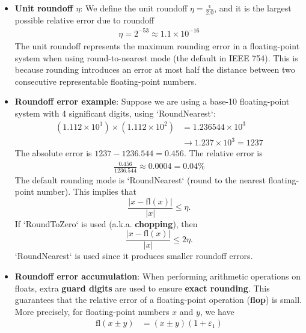 \documentclass{report}
\begin{document}
\begin{itemize}
            \item \textbf{Unit roundoff $\eta$}: We define the unit roundoff $\eta = \frac{\epsilon}{2.0}$, and it is the largest possible relative error due to roundoff
                \begin{align*}
                    \eta = 2^{-53} \approx 1.1 \times 10^{-16}
                \end{align*}
                \bigbreak \noindent 
                The unit roundoff represents the maximum rounding error in a floating-point system when using round-to-nearest mode
                \bigbreak \noindent 
                (the default in IEEE 754). This is because rounding introduces an error at most half the distance between two consecutive representable floating-point numbers.
            \item \textbf{Roundoff error example}: Suppose we are using a base-10 floating-point system with 4 significant digits, using `RoundNearest`:
                \begin{align*}
                    \left( 1.112 \times 10^1 \right) \times \left( 1.112 \times 10^2 \right)
                    & = 1.236544 \times 10^3 \\
                    & \rightarrow 1.237 \times 10^3 = 1237
                \end{align*}
                The absolute error is $1237 - 1236.544 = 0.456$.
                \bigbreak \noindent 
                The relative error is 
                \begin{align*}
                    \frac{0.456}{1236.544} \approx 0.0004 = 0.04 \%
                \end{align*}
                The default rounding mode is `RoundNearest` (round to the nearest floating-point number). This implies that
                $$ \frac{|x - \mathrm{fl}(x)|}{|x|} \leq \eta.$$
                If `RoundToZero` is used (a.k.a. \textbf{chopping}), then
                $$ \frac{|x - \mathrm{fl}(x)|}{|x|} \leq 2 \eta.$$
                `RoundNearest` is used since it produces smaller roundoff errors.
            \item \textbf{Roundoff error accumulation}: When performing arithmetic operations on floats, extra \textbf{guard digits} are used to ensure \textbf{exact rounding}. This guarantees that the relative error of a floating-point operation (\textbf{flop}) is small. More precisely, for floating-point numbers \(x\) and \(y\), we have
                \begin{align*}
                    \mathrm{fl}(x \pm y) &= (x \pm y)(1 + \varepsilon_1) \\

\end{align*}
\end{itemize}
\end{document}
